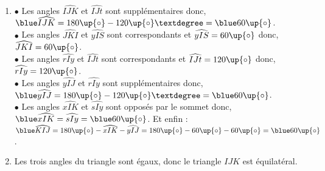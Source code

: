 \ \\ [-5mm]
   \begin{enumerate}
       \item $\bullet$ Les angles $\widehat{IJK}$ et $\widehat{IJt}$ sont supplémentaires donc, ${\blue \widehat{IJK}} =180\up{\circ}-120\up{\circ}° ={\blue 60\up{\circ}}$. \\
          $\bullet$ Les angles $\widehat{JKI}$ et $\widehat{yIS}$ sont correspondants et $\widehat{yIS} =60\up{\circ}$ donc, {\blue $\widehat{JKI} =60\up{\circ}$}. \\
          $\bullet$ Les angles $\widehat{rIy}$ et $\widehat{IJt}$ sont correspondants et $\widehat{IJt} =120\up{\circ}$ donc, {\blue $\widehat{rIy} =120\up{\circ}$}. \\
          $\bullet$ Les angles $\widehat{yIJ}$ et $\widehat{rIy}$ sont supplémentaires donc, ${\blue \widehat{yIJ}} =180\up{\circ}-120\up{\circ}° ={\blue 60\up{\circ}}$. \\
          $\bullet$ Les angles $\widehat{xIK}$ et $\widehat{sIy}$ sont opposés par le sommet donc, ${\blue \widehat{xIK}} =\widehat{sIy} ={\blue 60\up{\circ}}$. Et enfin : \\
          ${\blue \widehat{KIJ}} =180\up{\circ} -\widehat{xIK}-\widehat{yIJ} =180\up{\circ}-60\up{\circ}-60\up{\circ} ={\blue 60\up{\circ}}$.
       \item Les trois angles du triangle sont égaux, donc {\blue le triangle $IJK$ est équilatéral}.
   \end{enumerate}
